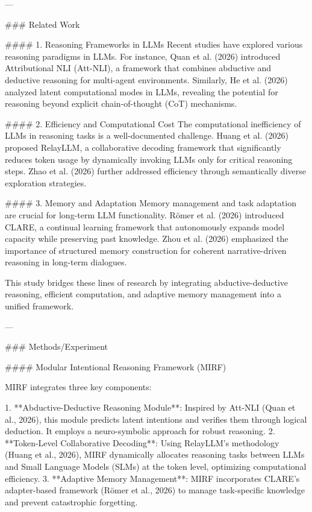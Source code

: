 ---

### Related Work

#### 1. Reasoning Frameworks in LLMs
Recent studies have explored various reasoning paradigms in LLMs. For instance, Quan et al. (2026) introduced Attributional NLI (Att-NLI), a framework that combines abductive and deductive reasoning for multi-agent environments. Similarly, He et al. (2026) analyzed latent computational modes in LLMs, revealing the potential for reasoning beyond explicit chain-of-thought (CoT) mechanisms.

#### 2. Efficiency and Computational Cost
The computational inefficiency of LLMs in reasoning tasks is a well-documented challenge. Huang et al. (2026) proposed RelayLLM, a collaborative decoding framework that significantly reduces token usage by dynamically invoking LLMs only for critical reasoning steps. Zhao et al. (2026) further addressed efficiency through semantically diverse exploration strategies.

#### 3. Memory and Adaptation
Memory management and task adaptation are crucial for long-term LLM functionality. Römer et al. (2026) introduced CLARE, a continual learning framework that autonomously expands model capacity while preserving past knowledge. Zhou et al. (2026) emphasized the importance of structured memory construction for coherent narrative-driven reasoning in long-term dialogues.

This study bridges these lines of research by integrating abductive-deductive reasoning, efficient computation, and adaptive memory management into a unified framework.

---

### Methods/Experiment

#### Modular Intentional Reasoning Framework (MIRF)

MIRF integrates three key components:

1. **Abductive-Deductive Reasoning Module**: Inspired by Att-NLI (Quan et al., 2026), this module predicts latent intentions and verifies them through logical deduction. It employs a neuro-symbolic approach for robust reasoning.
2. **Token-Level Collaborative Decoding**: Using RelayLLM's methodology (Huang et al., 2026), MIRF dynamically allocates reasoning tasks between LLMs and Small Language Models (SLMs) at the token level, optimizing computational efficiency.
3. **Adaptive Memory Management**: MIRF incorporates CLARE's adapter-based framework (Römer et al., 2026) to manage task-specific knowledge and prevent catastrophic forgetting.

